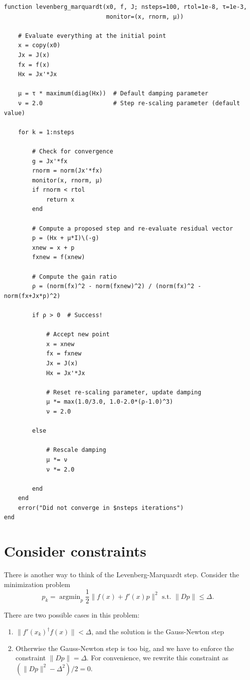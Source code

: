 \documentclass[12pt, leqno]{article} %
\providecommand{\tightlist}{%
  \setlength{\itemsep}{0pt}\setlength{\parskip}{0pt}}
\begin{document}
\begin{verbatim}
function levenberg_marquardt(x0, f, J; nsteps=100, rtol=1e-8, τ=1e-3,
                             monitor=(x, rnorm, μ))
    
    # Evaluate everything at the initial point
    x = copy(x0)
    Jx = J(x)
    fx = f(x)
    Hx = Jx'*Jx

    μ = τ * maximum(diag(Hx))  # Default damping parameter
    ν = 2.0                    # Step re-scaling parameter (default value)
    
    for k = 1:nsteps
        
        # Check for convergence
        g = Jx'*fx
        rnorm = norm(Jx'*fx)
        monitor(x, rnorm, μ)
        if rnorm < rtol
            return x
        end
        
        # Compute a proposed step and re-evaluate residual vector
        p = (Hx + μ*I)\(-g)
        xnew = x + p
        fxnew = f(xnew)
        
        # Compute the gain ratio
        ρ = (norm(fx)^2 - norm(fxnew)^2) / (norm(fx)^2 - norm(fx+Jx*p)^2)
        
        if ρ > 0  # Success!
            
            # Accept new point
            x = xnew
            fx = fxnew
            Jx = J(x)
            Hx = Jx'*Jx
            
            # Reset re-scaling parameter, update damping
            μ *= max(1.0/3.0, 1.0-2.0*(ρ-1.0)^3)
            ν = 2.0
        
        else
                
            # Rescale damping
            μ *= ν
            ν *= 2.0

        end
    end
    error("Did not converge in $nsteps iterations")
end
\end{verbatim}

\section{Consider constraints}

There is another way to think of the Levenberg-Marquardt step. Consider
the minimization problem
\[p_k = \operatorname{argmin}_p \frac{1}{2} \|f(x) + f'(x)p \|^2 \mbox{ s.t. }
  \|Dp\| \leq \Delta.\]

There are two possible cases in this problem:

\begin{enumerate}
\def\labelenumi{\arabic{enumi}.}
\tightlist
\item
  \(\|f'(x_k)^\dagger f(x)\| < \Delta\), and the solution is the
  Gauss-Newton step
\item
  Otherwise the Gauss-Newton step is too big, and we have to enforce the
  constraint \(\|Dp\| = \Delta\). For convenience, we rewrite this
  constraint as \((\|Dp\|^2-\Delta^2)/2 = 0\).
\end{enumerate}
\end{document}
